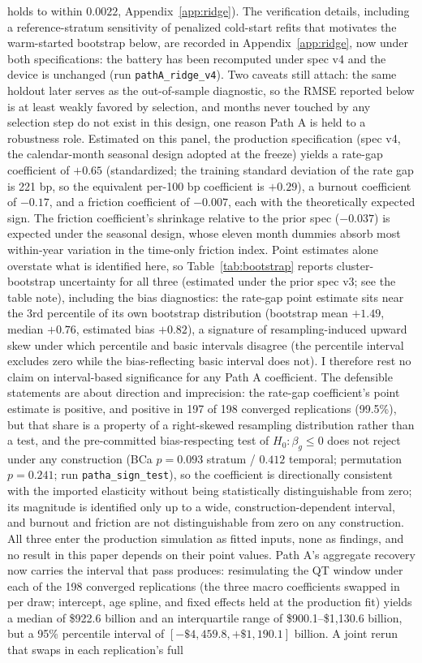\documentclass[12pt]{article}
\begin{document}
holds to within $0.0022$, Appendix~\ref{app:ridge}). The verification details, including a reference-stratum sensitivity of penalized cold-start refits that motivates the warm-started bootstrap below, are recorded in Appendix~\ref{app:ridge}, now under both specifications: the battery has been recomputed under spec v4 and the device is unchanged (run \texttt{pathA\_ridge\_v4}). Two caveats still attach: the same holdout later serves as the out-of-sample diagnostic, so the RMSE reported below is at least weakly favored by selection, and months never touched by any selection step do not exist in this design, one reason Path A is held to a robustness role.
Estimated on this panel, the production specification (spec v4, the calendar-month seasonal design adopted at the freeze) yields a rate-gap coefficient of $+0.65$ (standardized; the training standard deviation of the rate gap is 221 bp, so the equivalent per-100 bp coefficient is $+0.29$), a burnout coefficient of $-0.17$, and a friction coefficient of $-0.007$, each with the theoretically expected sign. The friction coefficient's shrinkage relative to the prior spec ($-0.037$) is expected under the seasonal design, whose eleven month dummies absorb most within-year variation in the time-only friction index. Point estimates alone overstate what is identified here, so Table~\ref{tab:bootstrap} reports cluster-bootstrap uncertainty for all three (estimated under the prior spec v3; see the table note), including the bias diagnostics: the rate-gap point estimate sits near the 3rd percentile of its own bootstrap distribution (bootstrap mean $+1.49$, median $+0.76$, estimated bias $+0.82$), a signature of resampling-induced upward skew under which percentile and basic intervals disagree (the percentile interval excludes zero while the bias-reflecting basic interval does not). I therefore rest no claim on interval-based significance for any Path A coefficient. The defensible statements are about direction and imprecision: the rate-gap coefficient's point estimate is positive, and positive in 197 of 198 converged replications (99.5\%), but that share is a property of a right-skewed resampling distribution rather than a test, and the pre-committed bias-respecting test of $H_0\!: \beta_g \le 0$ does not reject under any construction (BCa $p = 0.093$ stratum / $0.412$ temporal; permutation $p = 0.241$; run \texttt{patha\_sign\_test}), so the coefficient is directionally consistent with the imported elasticity without being statistically distinguishable from zero; its magnitude is identified only up to a wide, construction-dependent interval, and burnout and friction are not distinguishable from zero on any construction. All three enter the production simulation as fitted inputs, none as findings, and no result in this paper depends on their point values. Path A's aggregate recovery now carries the interval that pass produces: resimulating the QT window under each of the 198 converged replications (the three macro coefficients swapped in per draw; intercept, age spline, and fixed effects held at the production fit) yields a median of \$922.6 billion and an interquartile range of \$900.1--\$1{,}130.6 billion, but a 95\% percentile interval of $[-\$4{,}459.8, +\$1{,}190.1]$ billion. A joint rerun that swaps in each replication's full 
\end{document}
